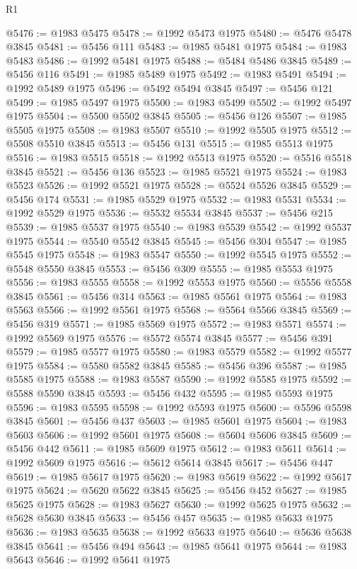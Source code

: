 \begin{lexlean}{R1}
\begin{coremodule}
@5476 := @1983 @5475
@5478 := @1992 @5473 @1975
@5480 := @5476 @5478 @3845
@5481 := @5456 @111
@5483 := @1985 @5481 @1975
@5484 := @1983 @5483
@5486 := @1992 @5481 @1975
@5488 := @5484 @5486 @3845
@5489 := @5456 @116
@5491 := @1985 @5489 @1975
@5492 := @1983 @5491
@5494 := @1992 @5489 @1975
@5496 := @5492 @5494 @3845
@5497 := @5456 @121
@5499 := @1985 @5497 @1975
@5500 := @1983 @5499
@5502 := @1992 @5497 @1975
@5504 := @5500 @5502 @3845
@5505 := @5456 @126
@5507 := @1985 @5505 @1975
@5508 := @1983 @5507
@5510 := @1992 @5505 @1975
@5512 := @5508 @5510 @3845
@5513 := @5456 @131
@5515 := @1985 @5513 @1975
@5516 := @1983 @5515
@5518 := @1992 @5513 @1975
@5520 := @5516 @5518 @3845
@5521 := @5456 @136
@5523 := @1985 @5521 @1975
@5524 := @1983 @5523
@5526 := @1992 @5521 @1975
@5528 := @5524 @5526 @3845
@5529 := @5456 @174
@5531 := @1985 @5529 @1975
@5532 := @1983 @5531
@5534 := @1992 @5529 @1975
@5536 := @5532 @5534 @3845
@5537 := @5456 @215
@5539 := @1985 @5537 @1975
@5540 := @1983 @5539
@5542 := @1992 @5537 @1975
@5544 := @5540 @5542 @3845
@5545 := @5456 @304
@5547 := @1985 @5545 @1975
@5548 := @1983 @5547
@5550 := @1992 @5545 @1975
@5552 := @5548 @5550 @3845
@5553 := @5456 @309
@5555 := @1985 @5553 @1975
@5556 := @1983 @5555
@5558 := @1992 @5553 @1975
@5560 := @5556 @5558 @3845
@5561 := @5456 @314
@5563 := @1985 @5561 @1975
@5564 := @1983 @5563
@5566 := @1992 @5561 @1975
@5568 := @5564 @5566 @3845
@5569 := @5456 @319
@5571 := @1985 @5569 @1975
@5572 := @1983 @5571
@5574 := @1992 @5569 @1975
@5576 := @5572 @5574 @3845
@5577 := @5456 @391
@5579 := @1985 @5577 @1975
@5580 := @1983 @5579
@5582 := @1992 @5577 @1975
@5584 := @5580 @5582 @3845
@5585 := @5456 @396
@5587 := @1985 @5585 @1975
@5588 := @1983 @5587
@5590 := @1992 @5585 @1975
@5592 := @5588 @5590 @3845
@5593 := @5456 @432
@5595 := @1985 @5593 @1975
@5596 := @1983 @5595
@5598 := @1992 @5593 @1975
@5600 := @5596 @5598 @3845
@5601 := @5456 @437
@5603 := @1985 @5601 @1975
@5604 := @1983 @5603
@5606 := @1992 @5601 @1975
@5608 := @5604 @5606 @3845
@5609 := @5456 @442
@5611 := @1985 @5609 @1975
@5612 := @1983 @5611
@5614 := @1992 @5609 @1975
@5616 := @5612 @5614 @3845
@5617 := @5456 @447
@5619 := @1985 @5617 @1975
@5620 := @1983 @5619
@5622 := @1992 @5617 @1975
@5624 := @5620 @5622 @3845
@5625 := @5456 @452
@5627 := @1985 @5625 @1975
@5628 := @1983 @5627
@5630 := @1992 @5625 @1975
@5632 := @5628 @5630 @3845
@5633 := @5456 @457
@5635 := @1985 @5633 @1975
@5636 := @1983 @5635
@5638 := @1992 @5633 @1975
@5640 := @5636 @5638 @3845
@5641 := @5456 @494
@5643 := @1985 @5641 @1975
@5644 := @1983 @5643
@5646 := @1992 @5641 @1975

\end{coremodule}
\end{lexlean}
